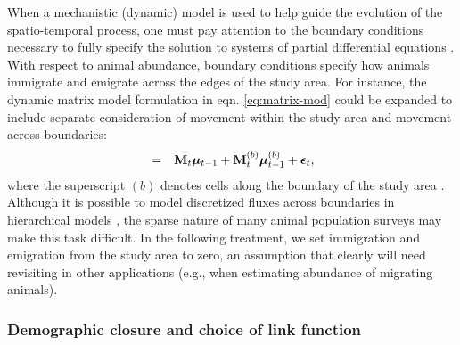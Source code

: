 \documentclass[12pt,english]{article}
\begin{document}
\begin{spacing}{1.9}
When a mechanistic (dynamic) model is used to help guide the evolution of the spatio-temporal process, one must pay attention to the boundary conditions necessary to fully specify the solution to systems of partial differential equations \citep[see e.g.,][]{Haberman1998}.  With respect to animal abundance, boundary conditions specify how animals immigrate and emigrate across the edges of the study area.  For instance, the dynamic matrix model formulation in eqn. \ref{eq:matrix-mod} could be expanded to include separate consideration of movement within the study area and movement across boundaries:
\begin{eqnarray*}
[\boldsymbol{\mu}_t  | \boldsymbol{\mu}_{t-1},\boldsymbol{\theta}] & = & {\bf M}_t  \boldsymbol{\mu}_{t-1} + {\bf M}_t^{(b)} \boldsymbol{\mu}_{t-1}^{(b)} + \boldsymbol{\epsilon}_t,
\end{eqnarray*}
where the superscript $(b)$ denotes cells along the boundary of the study area \citep[][Section 6.3.2]{CressieWikle2011}.   Although it is possible to model discretized fluxes across boundaries in hierarchical models \citep[see e.g.,][]{WikleEtAl2003b}, the sparse nature of many animal population surveys may make this task difficult.  In the following treatment, we set immigration and emigration from the study area to zero, an assumption that clearly will need revisiting in other applications (e.g., when estimating abundance of migrating animals).

\subsubsection{Demographic closure and choice of link function}


\end{spacing}
\end{document}
